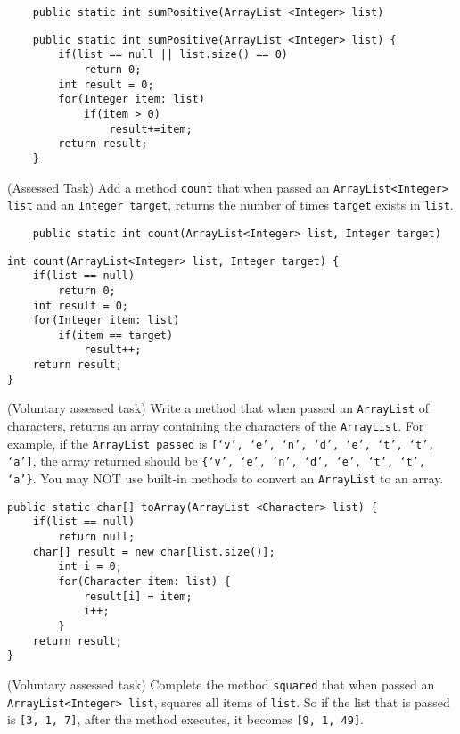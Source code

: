 \begin{questions}
\begin{lstlisting}
	public static int sumPositive(ArrayList <Integer> list)
\end{lstlisting}

\begin{solution}
\begin{lstlisting}
	public static int sumPositive(ArrayList <Integer> list) {
		if(list == null || list.size() == 0) 
			return 0;
		int result = 0;
		for(Integer item: list)
			if(item > 0)			
				result+=item;
		return result;
	}	
\end{lstlisting}	
\end{solution}

\question (Assessed Task) Add a method \texttt{count} that when passed an \texttt{ArrayList<Integer> list} and an \texttt{Integer target}, returns the number of times \texttt{target} exists in \texttt{list}.

\begin{lstlisting}
	public static int count(ArrayList<Integer> list, Integer target)
\end{lstlisting}

\begin{solution}
\begin{lstlisting}
int count(ArrayList<Integer> list, Integer target) {
	if(list == null)
		return 0;
	int result = 0;
	for(Integer item: list)
		if(item == target)
			result++;
	return result;
}
\end{lstlisting}
\end{solution}

\question (Voluntary assessed task) Write a method that when passed an \texttt{ArrayList} of characters, returns an array containing the characters of the \texttt{ArrayList}. For example, if the \texttt{ArrayList passed} is \texttt{[`v', `e', `n', `d', `e', `t', `t', `a']}, the array returned should be \texttt{\{`v', `e', `n', `d', `e', `t', `t', `a'\}}. You may NOT use built-in methods to convert an \texttt{ArrayList} to an array.

\begin{solution}
\begin{lstlisting}
public static char[] toArray(ArrayList <Character> list) {
	if(list == null) 
		return null;
	char[] result = new char[list.size()];
		int i = 0;
		for(Character item: list) {
			result[i] = item;
			i++;
		}
	return result;
}	
\end{lstlisting}	
\end{solution}


\question (Voluntary assessed task) Complete the method \texttt{squared} that when passed an \texttt{ArrayList<Integer> list}, squares all items of \texttt{list}. So if the list that is passed is \texttt{[3, 1, 7]}, after the method executes, it becomes \texttt{[9, 1, 49]}.


\end{questions}
